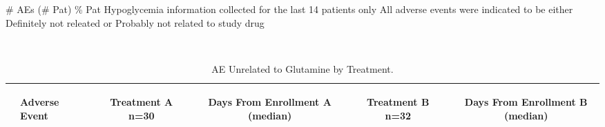 \documentclass[dvips,10pt]{article}
\begin{document}
\begin{table}[t]
\begin{center}
\begin{tabular}{ @{}l@{}
@{}l@{}@{}p{1.5em}@{}@{}c@{}@{}p{1.5em}@{}@{}c@{}
}
\end{tabular}


\parbox{ 5in }{ \# AEs (\# Pat) \% Pat \newline Hypoglycemia information collected for the last 14 patients only \newline \newline All adverse events were indicated to be either Definitely not releated or Probably not related 
 to study drug } \\
 \vspace{1em}\end{center}
 \end{table}
\clearpage
\begin{table}[t]
\caption
{ AE Unrelated to Glutamine by Treatment. }
\begin{center}
\begin{tabular}{ @{}l@{}
@{}l@{}@{}p{1.5em}@{}@{}c@{}@{}p{1.5em}@{}@{}c@{}@{}p{1.5em}@{}@{}c@{}@{}p{1.5em}@{}@{}c@{}
}
\hline

& \parbox{6em}{\begin{center}Adverse Event\end{center}} && \parbox{6em}{\begin{center}Treatment A n=30\end{center}} && \parbox{6em}{\begin{center}Days From Enrollment A (median)\end{center}} && \parbox{6em}{\begin{center}Treatment B n=32\end{center}} && \parbox{6em}{\begin{center}Days From Enrollment B (median)\end{center}} \\

\hline


\end{tabular}
\end{center}
\end{table}
\end{document}
